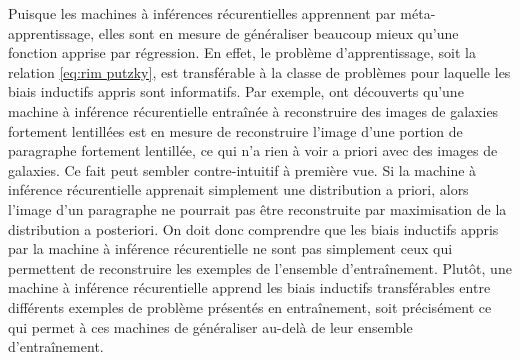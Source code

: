 Puisque les machines à inférences récurentielles apprennent par méta-apprentissage, elles sont en mesure de généraliser beaucoup mieux qu'une 
fonction apprise par régression. En effet, le problème d'apprentissage, soit la relation \eqref{eq:rim putzky}, 
est transférable à la classe de problèmes pour laquelle 
les biais inductifs appris sont informatifs. 
Par exemple, \citet{Morningstar2019} ont découverts qu'une machine à inférence récurentielle 
entraînée à reconstruire des images de galaxies fortement lentillées est en mesure de reconstruire l'image d'une portion de 
paragraphe fortement lentillée, ce qui n'a rien à voir a priori avec des images de galaxies. 
Ce fait peut sembler contre-intuitif à première vue. 
Si la machine à inférence récurentielle apprenait simplement 
une distribution a priori, alors l'image d'un paragraphe ne pourrait pas être reconstruite par maximisation de la 
distribution a posteriori. On doit donc comprendre que les biais inductifs appris par la machine à inférence 
récurentielle ne sont pas simplement ceux qui permettent de reconstruire les exemples de l'ensemble d'entraînement. 
Plutôt, une machine à inférence récurentielle apprend les biais inductifs transférables entre différents exemples 
de problème présentés en entraînement, soit précisément ce qui permet à ces machines de généraliser au-delà 
de leur ensemble d'entraînement.


